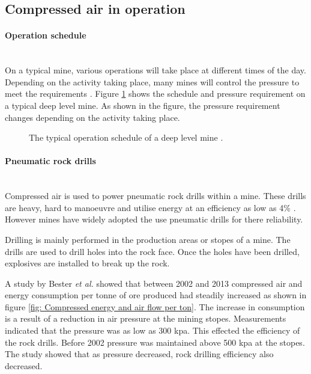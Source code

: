 \subsection{Compressed air in operation}
	\paragraph{Operation schedule}\leavevmode\\
	On a typical mine, various operations will take place at different times of the day. Depending on the activity taking place, many mines will control the pressure to meet the requirements \cite{Kriel2014Masters,Marais2012PhD}. Figure \ref{fig: Mining schedule} shows the schedule and pressure requirement on a typical deep level mine. As shown in the figure, the pressure requirement changes depending on the activity taking place.
		\begin{figure}[h]
		\centering
		\fbox{}
		\caption[A typical operation schedule of a deep level mine.]{The typical operation schedule of a deep level mine \cite{Kriel2014Masters}.}
		\label{fig: Mining schedule}
	\end{figure}
	\paragraph*{Pneumatic rock drills}\leavevmode\\
	Compressed air is used to power pneumatic rock drills within a mine. These drills are heavy, hard to manoeuvre and utilise energy at an efficiency as low as 4\% \cite{van2008development}. However mines have widely adopted the use pneumatic drills for there reliability. \par
	Drilling is mainly performed in the production areas or stopes of a mine. The drills are used to drill holes into the rock face. Once the holes have been drilled, explosives are installed to break up the rock.\par
	A study by  Bester \textit{et al.} showed that between 2002 and 2013 compressed air and energy consumption per tonne of ore produced had steadily increased as shown in figure \ref{fig: Compressed energy and air flow per ton}. The increase in consumption is a result of a reduction in air pressure at the mining stopes. Measurements indicated that the pressure was as low as 300 \gls{kpa}. This effected the efficiency of the rock drills. Before 2002 pressure was maintained above 500 \gls{kpa} at the stopes.  The study showed that as pressure decreased, rock drilling efficiency also decreased.\cite{bester2013effect} \par
	

